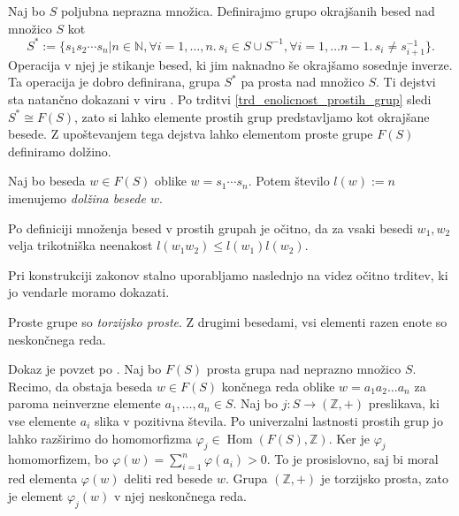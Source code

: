 Naj bo $S$ poljubna neprazna množica. Definirajmo grupo okrajšanih besed nad množico $S$ kot \begin{equation*}
    S^* := \{ s_1 s_2 \cdots s_n  \vert n \in \mathbb{N}, \forall i = 1, \ldots, n.\,  s_i \in S \cup S^{-1} , \forall i = 1 , \ldots n-1 .\, s_i \neq s_{i + 1}^{-1} \}.
\end{equation*}
Operacija v njej je stikanje besed, ki jim naknadno še okrajšamo sosednje inverze. Ta operacija je dobro definirana, grupa $S^*$ pa prosta nad množico $S$. 
Ti dejstvi sta natančno dokazani v viru \cite[str.~4, trditev 1.9]{Lyndon_Schupp_2015}. Po trditvi \ref{trd_enolicnost_prostih_grup} sledi $S^* \cong F(S)$,
zato si lahko elemente prostih grup predstavljamo kot okrajšane besede. Z upoštevanjem tega dejstva lahko elementom proste grupe $F(S)$ definiramo dolžino.

\begin{definicija}
\label{def_dolzina_besede}
Naj bo beseda $w \in  F(S)$ oblike $w = s_1 \cdots s_n$. Potem število $l(w) := n$ imenujemo \emph{dolžina besede $w$}.
\end{definicija}
\begin{opomba}\label{opm_trikotniska_neenakost}
    Po definiciji množenja besed v prostih grupah je očitno, da za vsaki besedi $w_1 , w_2$ velja trikotniška neenakost $l(w_1 w_2) \le l(w_1) l(w_2)$.
\end{opomba}

Pri konstrukciji zakonov stalno uporabljamo naslednjo na videz očitno trditev, ki jo vendarle moramo dokazati. 

\begin{trditev}\label{trd_prosta_grupa_je_torzijsko_prosta}
    Proste grupe so \emph{torzijsko proste}. Z drugimi besedami, vsi elementi razen enote so neskončnega reda. 
\end{trditev}
\begin{dokaz}
  Dokaz je povzet po \cite[str.~4--5]{Pogacnik_2024}. 
  Naj bo $F(S)$ prosta grupa nad neprazno množico $S$. Recimo, da obstaja beseda $w \in F(S)$ končnega reda oblike $w = a_1 a_2 \ldots a_n$ za paroma neinverzne elemente $a_1, \ldots , a_n \in S$. Naj bo $j : S \to (\mathbb{Z}, +)$ preslikava, ki vse elemente $a_i$ slika v pozitivna števila. Po univerzalni lastnosti prostih grup jo lahko razširimo do homomorfizma $\varphi_j \in \operatorname{Hom}(F(S), \mathbb{Z})$. 
    Ker je $\varphi_j$ homomorfizem, bo $\varphi(w) = \sum_{i = 1}^{n} \varphi(a_i) > 0$. To je prosislovno, saj bi moral red elementa $\varphi(w)$ deliti red besede $w$.
    Grupa $(\mathbb{Z}, +)$ je torzijsko prosta, zato je element $\varphi_j(w)$ v njej neskončnega reda.
\end{dokaz}


